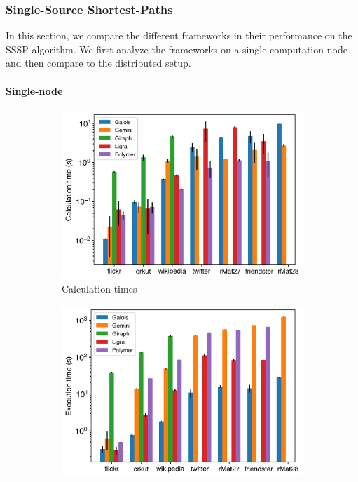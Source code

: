 

\subsubsection{Single-Source Shortest-Paths}
In this section, we compare the different frameworks in their performance on the SSSP algorithm. We first analyze the frameworks on a single computation node and then compare to the distributed setup.
\paragraph{Single-node}
\begin{figure}[ht]
	\begin{subfigure}{0.32\textwidth}
		\includegraphics[width=\linewidth]{../../plots/singleNodeSSSP_calcTime.png}
		\caption{Calculation times}
		\label{fig:singleNodeSSSP_calc}
	\end{subfigure}
	\hfil
	\begin{subfigure}{0.32\textwidth}
		\includegraphics[width=\linewidth]{../../plots/singleNodeSSSP_execTime.png}

\end{subfigure}
\end{figure}
